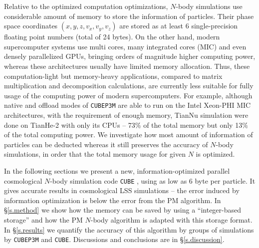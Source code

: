 \documentclass[10pt,twocolumn,preprint]{emulateapj}
\begin{document}
Relative to the optimized computation optimizations, $N$-body simulations use considerable amount of memory to store the information of particles. Their phase space coordinates $(x,y,z,v_x,v_y,v_z)$ are stored as at least 6 single-precision floating point numbers (total of 24 bytes). On the other hand, modern supercomputer systems use multi cores, many integrated cores (MIC) and even densely parallelized GPUs, bringing orders of magnitude higher computing power, whereas these architectures usually have limited memory allocation. Thus, these computation-light but memory-heavy applications, compared to matrix multiplication and decomposition calculations, are currently less suitable for fully usage of the computing power of modern supercomputers. For example, although native and offload modes of {\tt CUBEP3M} are able to run on the Intel Xeon-PHI MIC architectures, with the requirement of enough memory, TianNu simulation were done on TianHe-2 with only its CPUs -- 73\% of the total memory but only 13\% of the total computing power. We investigate how most amount of information of particles can be deducted whereas it still preserves the accuracy of $N$-body simulations, in order that the total memory usage for given $N$ is optimized.

In the following sections we present a new, information-optimized parallel cosmological $N$-body simulation code {\tt CUBE} \citep{haoran_yu_2018_1198909}, using as low as 6 byte per particle. It gives accurate results in cosmological LSS simulations -- the error induced by information optimization is below the error from the PM algorithm. In \S\ref{s.method} we show how the memory can be saved by using a ``integer-based storage'' and how the PM $N$-body algorithm is adapted with this storage format. In \S\ref{s.results} we quantify the accuracy of this algorithm by groups of simulations by {\tt CUBEP3M} and {\tt CUBE}. Discussions and conclusions are in \S\ref{s.discussion}.
\end{document}
